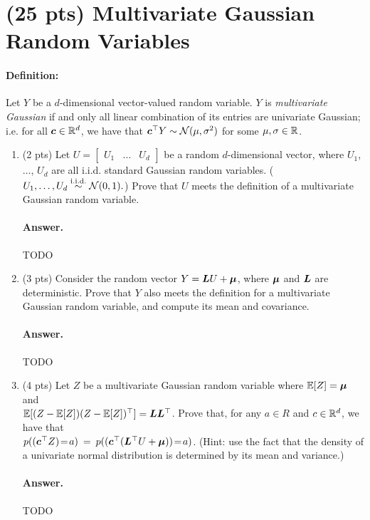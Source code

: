 \documentclass[11pt,letterpaper]{article}
\newenvironment{answer}{%
    \vspace{1em}
    \color{black}
    \paragraph{Answer.}
  }{%
    \vspace{1em}
  }
\begin{document}
\section{(25 pts) Multivariate Gaussian Random Variables}

\paragraph{Definition:}
Let $Y$ be a $d$-dimensional vector-valued random variable.
$Y$ is \emph{multivariate Gaussian} if and only all linear combination of its entries are univariate Gaussian;
i.e. for all ${\bm{c}} \in \mathbb{R}^d$, we have that ${\bm{c}}^\top Y \sim \mathcal{N}(\mu, \sigma^2)$ for some $\mu, \sigma \in \mathbb{R}$.

\begin{enumerate}
  \item (2 pts) Let $U = \begin{bmatrix} U_1 & \ldots & U_d\end{bmatrix}$ be a random $d$-dimensional vector,
    where $U_1$, $\ldots$, $U_d$ are all i.i.d. standard Gaussian random variables.
    ($U_1, \ldots, U_d \overset{\mathrm{i.i.d.}}{\sim} \mathcal{N}(0, 1).$)
    Prove that $U$ meets the definition of a multivariate Gaussian random variable.

\begin{answer}
  TODO
\end{answer}

  \item (3 pts) Consider the random vector $Y = {\bm{L}} U + {\bm{\mu}}$, where ${\bm{\mu}}$ and ${\bm{L}}$ are deterministic.
    Prove that $Y$ also meets the definition for a multivariate Gaussian random variable, and compute its mean and covariance.

\begin{answer}
  TODO
\end{answer}

  \item (4 pts) Let $Z$ be a multivariate Gaussian random variable where $\mathbb{E}[Z] = {\bm{\mu}}$ and \\
    $\mathbb{E}[(Z - \mathbb{E}[Z])(Z - \mathbb{E}[Z])^\top] = {\bm{L}}{\bm{L}}^\top$.
    Prove that, for any $a \in R$ and $c \in \mathbb{R}^d$, we have that \\
    $p(({\bm{c}}^\top Z)\!=\!a) \: = \: p(({\bm{c}}^\top ({\bm{L}}^\top U + {\bm{\mu}}))\!=\!a)$.
    (Hint: use the fact that the density of a univariate normal distribution is determined by its mean and variance.)

\begin{answer}
  TODO
\end{answer}

\end{enumerate}
\end{document}
